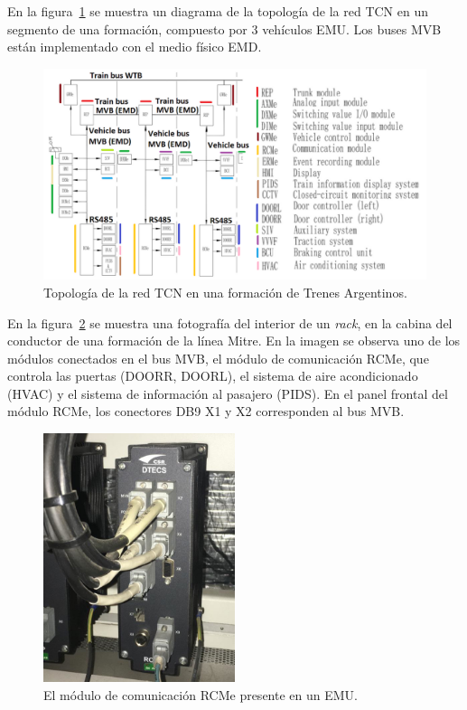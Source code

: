 En la figura~\ref{fig:tms} se muestra un diagrama de la topología de la red TCN en un segmento de una formación, compuesto por 3 vehículos EMU. Los buses MVB están implementado con el medio físico EMD.

\begin{figure}[htbp]
	\centering
	\includegraphics[width=1\textwidth]{./Figures/tms.png}
	\caption[Topología de la red TCN en una formación de Trenes Argentinos]{Topología de la red TCN en una formación de Trenes Argentinos.
        \\ }
    \label{fig:tms}
\end{figure}

En la figura~\ref{fig:rcme} se muestra una fotografía del interior de un \textit{rack}, en la cabina del conductor de una formación de la línea Mitre. En la imagen se observa uno de los módulos conectados en el bus MVB, el módulo de comunicación RCMe, que controla las puertas (DOORR, DOORL), el sistema de aire acondicionado (HVAC) y el sistema de información al pasajero (PIDS). En el panel frontal del módulo RCMe, los conectores DB9 X1 y X2 corresponden al bus MVB.

\begin{figure}[htbp]
	\centering
	\includegraphics[width=0.5\textwidth]{./Figures/RCMe.jpeg}
	\caption[El módulo de comunicación RCMe]{El módulo de comunicación RCMe presente en un EMU.
        \\ }
    \label{fig:rcme}
\end{figure}

